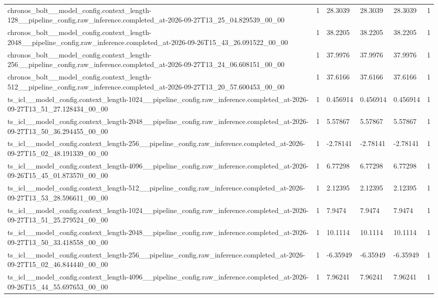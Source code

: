 \begin{tabular}{llllll}
chronos\_bolt\_\_model\_config.context\_length-128\_\_pipeline\_config.raw\_inference.completed\_at-2026-09-27T13\_25\_04.829539\_00\_00 & 1 & 28.3039 & 28.3039 & 28.3039 & 1 \\
chronos\_bolt\_\_model\_config.context\_length-2048\_\_pipeline\_config.raw\_inference.completed\_at-2026-09-26T15\_43\_26.091522\_00\_00 & 1 & 38.2205 & 38.2205 & 38.2205 & 1 \\
chronos\_bolt\_\_model\_config.context\_length-256\_\_pipeline\_config.raw\_inference.completed\_at-2026-09-27T13\_24\_06.608151\_00\_00 & 1 & 37.9976 & 37.9976 & 37.9976 & 1 \\
chronos\_bolt\_\_model\_config.context\_length-512\_\_pipeline\_config.raw\_inference.completed\_at-2026-09-27T13\_20\_57.600453\_00\_00 & 1 & 37.6166 & 37.6166 & 37.6166 & 1 \\
ts\_icl\_\_model\_config.context\_length-1024\_\_pipeline\_config.raw\_inference.completed\_at-2026-09-27T13\_51\_27.128434\_00\_00 & 1 & 0.456914 & 0.456914 & 0.456914 & 1 \\
ts\_icl\_\_model\_config.context\_length-2048\_\_pipeline\_config.raw\_inference.completed\_at-2026-09-27T13\_50\_36.294455\_00\_00 & 1 & 5.57867 & 5.57867 & 5.57867 & 1 \\
ts\_icl\_\_model\_config.context\_length-256\_\_pipeline\_config.raw\_inference.completed\_at-2026-09-27T15\_02\_48.191339\_00\_00 & 1 & -2.78141 & -2.78141 & -2.78141 & 1 \\
ts\_icl\_\_model\_config.context\_length-4096\_\_pipeline\_config.raw\_inference.completed\_at-2026-09-26T15\_45\_01.873570\_00\_00 & 1 & 6.77298 & 6.77298 & 6.77298 & 1 \\
ts\_icl\_\_model\_config.context\_length-512\_\_pipeline\_config.raw\_inference.completed\_at-2026-09-27T13\_53\_28.596611\_00\_00 & 1 & 2.12395 & 2.12395 & 2.12395 & 1 \\
ts\_icl\_\_model\_config.context\_length-1024\_\_pipeline\_config.raw\_inference.completed\_at-2026-09-27T13\_51\_25.279524\_00\_00 & 1 & 7.9474 & 7.9474 & 7.9474 & 1 \\
ts\_icl\_\_model\_config.context\_length-2048\_\_pipeline\_config.raw\_inference.completed\_at-2026-09-27T13\_50\_33.418558\_00\_00 & 1 & 10.1114 & 10.1114 & 10.1114 & 1 \\
ts\_icl\_\_model\_config.context\_length-256\_\_pipeline\_config.raw\_inference.completed\_at-2026-09-27T15\_02\_46.844440\_00\_00 & 1 & -6.35949 & -6.35949 & -6.35949 & 1 \\
ts\_icl\_\_model\_config.context\_length-4096\_\_pipeline\_config.raw\_inference.completed\_at-2026-09-26T15\_44\_55.697653\_00\_00 & 1 & 7.96241 & 7.96241 & 7.96241 & 1 \\

\end{tabular}
